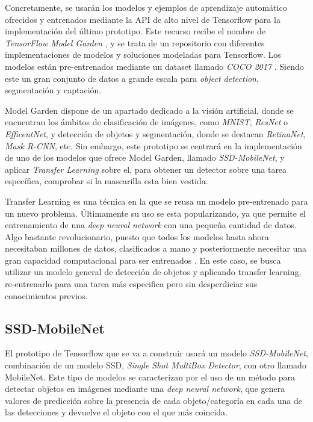 Concretamente, se usarán los modelos y ejemplos de aprendizaje automático ofrecidos y entrenados mediante la API de alto nivel de Tensorflow para la implementación del último prototipo. Este recurso recibe el nombre de \textit{TensorFlow Model Garden} \cite{modelGarden}, y se trata de un repositorio con diferentes implementaciones de modelos y soluciones modeladas para Tensorflow. Los modelos están pre-entrenados mediante un dataset llamado \textit{COCO 2017} \cite{coco}. Siendo este un gran conjunto de datos a grande escala para \textit{object detection}, segmentación y captación.

Model Garden dispone de un apartado dedicado a la visión artificial, donde se encuentran los ámbitos de clasificación de imágenes, como \textit{MNIST}, \textit{ResNet} o \textit{EfficentNet}, y detección de objetos y segmentación, donde se destacan \textit{RetinaNet}, \textit{Mask R-CNN}, etc. Sin embargo, este prototipo se centrará en la implementación de uno de los modelos que ofrece Model Garden, llamado \textit{SSD-MobileNet}, y aplicar \textit{Transfer Learning} sobre el, para obtener un detector sobre una tarea específica, comprobar si la mascarilla esta bien vestida.

Transfer Learning es una técnica en la que se reusa un modelo pre-entrenado para un nuevo problema. Últimamente su uso se esta popularizando, ya que permite el entrenamiento de una \textit{deep neural network} con una pequeña cantidad de datos. Algo bastante revolucionario, puesto que todos los modelos hasta ahora necesitaban millones de datos, clasificados a mano y posteriormente necesitar una gran capacidad computacional para ser entrenados \cite{transferLearning}. En este caso, se busca utilizar un modelo general de detección de objetos y aplicando transfer learning, re-entrenarlo para una tarea más especifica pero sin desperdiciar sus conocimientos previos.

\subsection*{SSD-MobileNet}

El prototipo de Tensorflow que se va a construir usará un modelo \textit{SSD-MobileNet}, combinación de un modelo SSD, \textit{Single Shot MultiBox Detector}, con otro llamado MobileNet. Este tipo de modelos se caracterizan por el uso de un método para detectar objetos en imágenes mediante una \textit{deep neural network}, que genera valores de predicción sobre la presencia de cada objeto/categoría en cada una de las detecciones y devuelve el objeto con el que más coincida.

